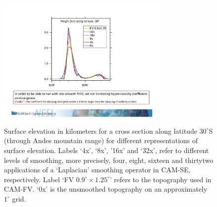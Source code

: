 \documentclass[gmd]{copernicus}
\begin{document}
\begin{figure}[t]
\vspace*{2mm}
\begin{center}
\includegraphics[width=8.3cm]{fig/topo-smoothing-height}
\end{center}
  \caption{Surface elevation in kilometers for a cross section along latitude $30^\circ$S (through Andes mountain range) for different representations of surface elevation. Labels `4x', `8x', '16x' and `32x', refer to different levels of smoothing, more precisely, four, eight, sixteen and thirtytwo applications of a `Laplacian' smoothing operator in CAM-SE, respectively. Label `FV $0.9^\circ \times 1.25^\circ$' refers to the topography used in CAM-FV. `0x' is the unsmoothed topography on an approximately $1^\circ$ grid.}\label{fig:topo-smoothing-height}
\end{figure}
\end{document}
